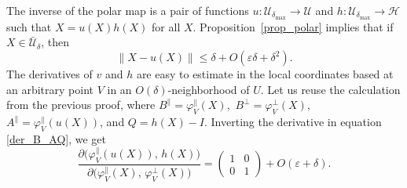 \documentclass[12pt]{article}
\newcommand{\calH}{\mathcal{H}}
\newcommand{\calU}{\mathcal{U}}
\newcommand{\eps}{\varepsilon}
\newcommand{\ph}{\varphi}
\renewcommand{\le}{\leqslant}
\newtheorem[definition]{Definition}[Theorem]{Definition}
\newtheorem[remark]{Example}[Theorem]{Example}
\newtheorem[remark]{Remark}[Theorem]{Remark}
\newtheorem[remark]{Question}[Theorem]{Open question}
\newtheorem*[definition]{definition}{Definition}
\newtheorem*[remark]{example}{Example}
\newtheorem*[remark]{remark}{Remark}
\newtheorem*[remark]{question}{Open question}
\numberwithin{equation}{section}
\begin{document}
The inverse of the polar map is a pair of functions $u\colon \calU_{\delta_{\max}}\to\calU$ and $h\colon \calU_{\delta_{\max}}\to\calH$ such that $X=u(X)h(X)$ for all $X$. Proposition~\ref{prop_polar} implies that if $X\in\bar{\calU}_\delta$, then
\begin{equation}
\|X-u(X)\|\le \delta+O(\eps\delta+\delta^2).
\end{equation}
The derivatives of $v$ and $h$ are easy to estimate in the local coordinates based at an arbitrary point $V$ in an $O(\delta)$-neighborhood of $U$. Let us reuse the calculation from the previous proof, where 
$B^\parallel=\ph_V^\parallel(X)$,\, $B^\perp=\ph_V^\perp(X)$,\, $A^\parallel=\ph_V^\parallel(u(X))$, and $Q=h(X)-I$. Inverting the derivative in equation \eqref{der_B_AQ}, we get
\begin{equation}
\frac{\partial\bigl(\ph_V^\parallel(u(X)),\,h(X)\bigr)}
{\partial\bigl(\ph_V^\parallel(X),\,\ph_V^\perp(X)\bigr)}
=\begin{pmatrix}1&0\\ 0&1\end{pmatrix}+O(\eps+\delta).
\end{equation}
\end{document}

